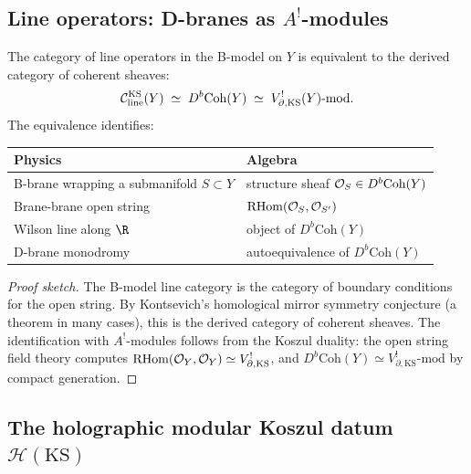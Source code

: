 \subsection{Line operators: D-branes as \texorpdfstring{$A^!$}{A!}-modules}

\begin{theorem}
The category of line operators in the B-model on $Y$ is equivalent
to the derived category of coherent sheaves:
\begin{equation}%
\cC_{\mathrm{line}}^{\mathrm{KS}}(Y)
\;\simeq\;
D^b\mathrm{Coh}(Y)
\;\simeq\;
V_{\partial,\mathrm{KS}}^!(Y)\text{-mod}.
\end{equation}
The equivalence identifies:
\begin{center}
\renewcommand{\arraystretch}{1.2}
\begin{tabular}{ll}
\textbf{Physics} & \textbf{Algebra} \\
\hline
B-brane wrapping a submanifold $S\subset Y$
& structure sheaf $\mathcal O_S\in D^b\mathrm{Coh}(Y)$ \\
Brane-brane open string & $\operatorname{RHom}(\mathcal O_S,\mathcal O_{S'})$ \\
Wilson line along $\R$ & object of $D^b\mathrm{Coh}(Y)$ \\
D-brane monodromy & autoequivalence of $D^b\mathrm{Coh}(Y)$
\end{tabular}
\end{center}
\end{theorem}

\begin{proof}[Proof sketch]
The B-model line category is the category of boundary conditions
for the open string. By Kontsevich's homological mirror symmetry
conjecture (a theorem in many cases), this is the derived category
of coherent sheaves. The identification with $A^!$-modules follows
from the Koszul duality: the open string field theory computes
$\operatorname{RHom}(\mathcal O_Y,\mathcal O_Y)\simeq V^!_{\partial,\mathrm{KS}}$, and
$D^b\mathrm{Coh}(Y)\simeq V^!_{\partial,\mathrm{KS}}\text{-mod}$
by compact generation.
\end{proof}


\subsection{The holographic modular Koszul datum \texorpdfstring{$\mathcal{H}(\mathrm{KS})$}{H(KS)}}

